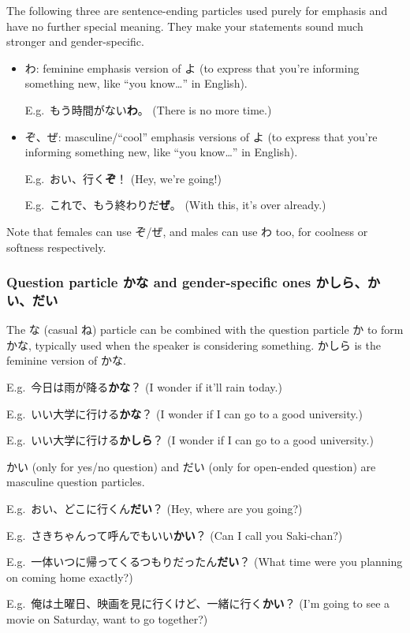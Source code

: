 \documentclass[../nihongo-gakushuu-kyouzai-grammar.tex]{subfiles}
\begin{document}
The following three are sentence-ending particles used purely for  emphasis and have no further special meaning. They make your statements sound much stronger and gender-specific.
\begin{itemize}
    \item わ: feminine emphasis version of よ (to express that you're informing something new, like ``you know\dots'' in English).

    E.g.\ もう時間がない\textbf{わ}。 (There is no more time.)
    \item ぞ、ぜ: masculine/``cool'' emphasis versions of よ (to express that you're informing something new, like ``you know\dots'' in English).

    E.g.\ おい、行く\textbf{ぞ}！ (Hey, we're going!)

    E.g.\ これで、もう終わりだ\textbf{ぜ}。 (With this, it's over already.)
\end{itemize}

Note that females can use ぞ/ぜ, and males can use わ too, for coolness or softness respectively.


\subsubsection{Question particle かな and gender-specific ones かしら、かい、だい} \label{sec:gender-specific-question-particles}

The な (casual ね) particle can be combined with the question particle か to form かな, typically used when the speaker is considering something. かしら is the feminine version of かな.

E.g.\ 今日は雨が降る\textbf{かな}？ (I wonder if it'll rain today.)

E.g.\ いい大学に行ける\textbf{かな}？ (I wonder if I can go to a good university.)

E.g.\ いい大学に行ける\textbf{かしら}？ (I wonder if I can go to a good university.)

かい (only for yes/no question) and だい (only for open-ended question) are masculine question particles.

E.g.\ おい、どこに行くん\textbf{だい}？ (Hey, where are you going?)

E.g.\ さきちゃんって呼んでもいい\textbf{かい}？ (Can I call you Saki-chan?)

E.g.\ 一体いつに帰ってくるつもりだったん\textbf{だい}？ (What time were you planning on coming home exactly?)

E.g.\ 俺は土曜日、映画を見に行くけど、一緒に行く\textbf{かい}？ (I'm going to see a movie on Saturday, want to go together?)
\end{document}
